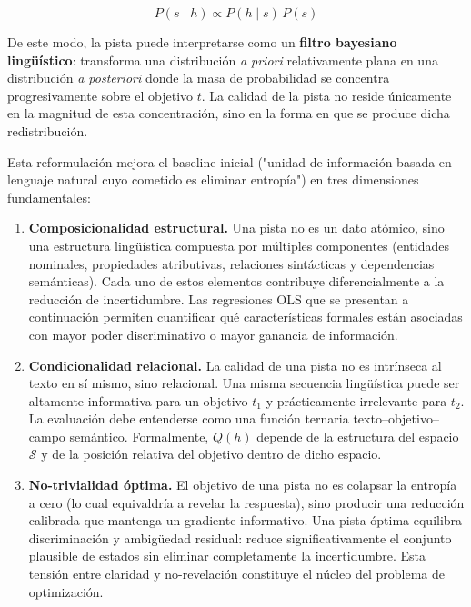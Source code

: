 \[
P(s \mid h) \propto P(h \mid s)\,P(s)
\]

De este modo, la pista puede interpretarse como un \textbf{filtro bayesiano lingüístico}: transforma una distribución \textit{a priori} relativamente plana en una distribución \textit{a posteriori} donde la masa de probabilidad se concentra progresivamente sobre el objetivo $t$. La calidad de la pista no reside únicamente en la magnitud de esta concentración, sino en la forma en que se produce dicha redistribución.

Esta reformulación mejora el baseline inicial ("unidad de información basada en lenguaje natural cuyo cometido es eliminar entropía") en tres dimensiones fundamentales:

\begin{enumerate}

\item \textbf{Composicionalidad estructural.}
Una pista no es un dato atómico, sino una estructura lingüística compuesta por múltiples componentes (entidades nominales, propiedades atributivas, relaciones sintácticas y dependencias semánticas). Cada uno de estos elementos contribuye diferencialmente a la reducción de incertidumbre. Las regresiones OLS que se presentan a continuación permiten cuantificar qué características formales están asociadas con mayor poder discriminativo o mayor ganancia de información.

\item \textbf{Condicionalidad relacional.}
La calidad de una pista no es intrínseca al texto en sí mismo, sino relacional. Una misma secuencia lingüística puede ser altamente informativa para un objetivo $t_1$ y prácticamente irrelevante para $t_2$. La evaluación debe entenderse como una función ternaria texto–objetivo–campo semántico. Formalmente, $Q(h)$ depende de la estructura del espacio $\mathcal{S}$ y de la posición relativa del objetivo dentro de dicho espacio.

\item \textbf{No-trivialidad óptima.}
El objetivo de una pista no es colapsar la entropía a cero (lo cual equivaldría a revelar la respuesta), sino producir una reducción calibrada que mantenga un gradiente informativo. Una pista óptima equilibra discriminación y ambigüedad residual: reduce significativamente el conjunto plausible de estados sin eliminar completamente la incertidumbre. Esta tensión entre claridad y no-revelación constituye el núcleo del problema de optimización.

\end{enumerate}

